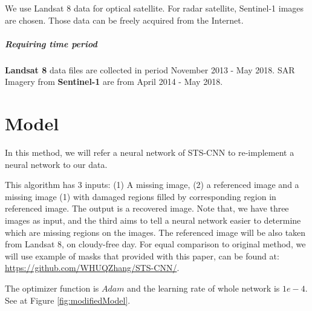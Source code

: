 We use Landsat 8 data for optical satellite. For radar satellite, Sentinel-1 images are chosen. Those data can be freely acquired from the Internet.

\subparagraph{Requiring time period} \textbf{Landsat 8} data files are collected in period November 2013 - May 2018. SAR Imagery from \textbf{Sentinel-1} are from April 2014 - May 2018.

\section{Model}

In this method, we will refer a neural network of STS-CNN\cite{Zhang2018} to re-implement a neural network to our data. 

This algorithm has 3 inputs: (1) A missing image, (2) a referenced image and a missing image (1) with damaged regions filled by corresponding region in referenced image. The output is a recovered image. Note that, we have three images as input, and the third aims to tell a neural network easier to determine which are missing regions on the images. The referenced image will be also taken from Landsat 8, on cloudy-free day. For equal comparison to original method, we will use example of masks that provided with this paper, can be found at: \href{https://github.com/WHUQZhang/STS-CNN/}{https://github.com/WHUQZhang/STS-CNN/}.

The optimizer function is $Adam$ and the learning rate of whole network is $1e-4$. See at Figure \ref{fig:modifiedModel}.


